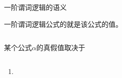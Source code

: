 
\begin{frame}{}
  \begin{center}
    一阶谓词逻辑的语义
  \end{center}
\end{frame}

\begin{frame}{}
  \begin{center}
    一阶谓词逻辑公式的就是该公式的值。

    \[
    \]

    \pause
    \vspace{0.60cm}
    某个公式$\alpha$的真假值取决于
    \vspace{0.30cm}
    \begin{columns}
        \begin{enumerate}[(1)]
          \setlength{\itemsep}{6pt}
          \item
        \end{enumerate}
    \end{columns}
  \end{center}
\end{frame}

\begin{frame}{}
\end{frame}

\begin{frame}{}
\end{frame}

\begin{frame}{}
\end{frame}
